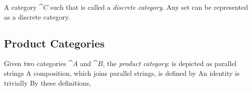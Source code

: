 A category $\cat{C}$ such that
is called a \textit{discrete category}.
Any set can be represented as a discrete category.


\subsection{Product Categories}

Given two categories $\cat{A}$ and $\cat{B}$, the \textit{product category}:
is depicted as parallel strings
A composition, which joins  parallel strings, is defined by
An identity is trivially
By these definitions,




